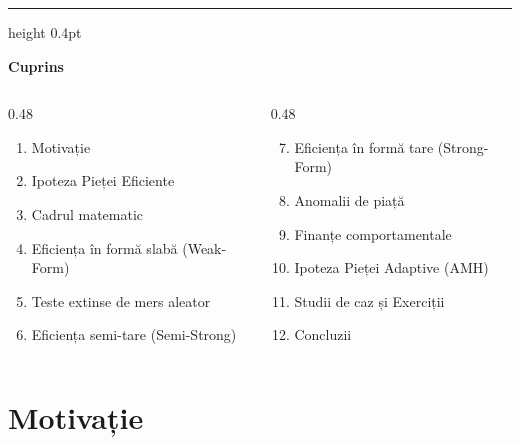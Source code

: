 \documentclass[9pt, aspectratio=169, t]{beamer}
\theoremstyle{definition}
\begin{document}
{
\begin{frame}{}
    {\color{FooterGray}\hrule height 0.4pt}
    \vspace{0.1cm}
    {\Large\textcolor{IDAred}{\textbf{Cuprins}}}
    \vspace{0.2cm}
    {\small
    \begin{columns}[T]
        \begin{column}{0.48\textwidth}
            \begin{enumerate}
                \item Motivație
                \item Ipoteza Pieței Eficiente
                \item Cadrul matematic
                \item Eficiența în formă slabă (Weak-Form)
                \item Teste extinse de mers aleator
                \item Eficiența semi-tare (Semi-Strong)
            \end{enumerate}
        \end{column}
        \begin{column}{0.48\textwidth}
            \begin{enumerate}\setcounter{enumi}{6}
                \item Eficiența în formă tare (Strong-Form)
                \item Anomalii de piață
                \item Finanțe comportamentale
                \item Ipoteza Pieței Adaptive (AMH)
                \item Studii de caz și Exerciții
                \item Concluzii
            \end{enumerate}
        \end{column}
    \end{columns}
    }
\end{frame}
}

\section{Motivație}
\end{document}
